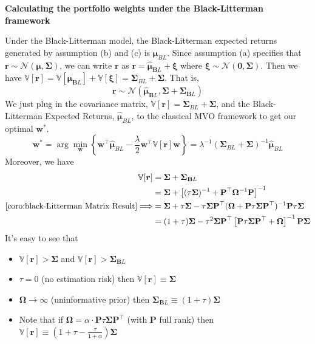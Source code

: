 \documentclass[13pt]{article}
\theoremstyle{definition}
\theoremstyle{remark}
\newenvironment{remark}
  {\pushQED{\qed}\renewcommand{\qedsymbol}{$\triangle$}\remarkx}
  {\popQED\endremarkx}
\begin{document}
{\color{C6}\textbf{Calculating the portfolio weights under the Black-Litterman framework}}

Under the Black-Litterman model, the Black-Litterman expected returns generated by assumption (b) and (c) is  $\bm{\mu}_{BL}$. Since assumption (a) specifies that $\bm{r} \sim \mathcal{N}\left(\bm{\mu}, \mathbf{\Sigma}\right)$, we can write $\bm{r}$ as $\bm{r} = \bm{\hat{\bm{\mu}}}_{\mathbf{B} L} + \bm{\xi}$ where $\bm{\xi} \sim \mathcal{N}\left(\bm{0}, \mathbf{\Sigma}\right)$. Then we have $\mathbb{V}[\bm{r}] = \mathbb{V}[\bm{\hat{\bm{\mu}}}_{\mathbf{B} L}] + \mathbb{V}[\bm{\xi}] = \mathbf{\Sigma}_{BL}+\mathbf{\Sigma}$. That is,
$$\bm{r} \sim \mathcal{N}\left(\bm{\hat{\bm{\mu}}}_{\mathbf{B} L}, \mathbf{\Sigma}+\mathbf{\Sigma}_{\mathbf{B} L}\right)$$
We just plug in the covariance matrix, $\mathbb{V}[\bm{r}] = \mathbf{\Sigma}_{BL}+\mathbf{\Sigma}$, and the Black-Litterman Expected Returns, $\bm{\hat{\bm{\mu}}}_{BL}$, to the classical MVO framework to get our optimal $\bm{w}^*$.
$$\bm{w}^*=\arg
\min_{\bm{w}}\left\{\bm{w}^\top \bm{\hat{\bm{\mu}}}_{BL}-\frac{\lambda}{2}\bm{w}^\top \mathbb{V}[\bm{r}]\bm{w} \right\}= \lambda^{-1}(\mathbf{\Sigma}_{BL}+\mathbf{\Sigma})^{-1}\bm{\hat{\bm{\mu}}}_{BL}
$$
\begin{remark}
Moreover, we have
$$
\begin{aligned}
\mathbb{V}[\bm{r}] & =\mathbf{\Sigma}+\mathbf{\Sigma}_{\mathbf{B} L} \\
& =\mathbf{\Sigma}+\left[(\tau \mathbf{\Sigma})^{-1}+\mathbf{P}^{\top} \mathbf{\Omega}^{-1} \mathbf{P}\right]^{-1} \\
\cref{coro:black-Litterman Matrix Result} \Longrightarrow& =\mathbf{\Sigma}+\tau \mathbf{\Sigma}-\tau \mathbf{\Sigma} \mathbf{P}^\top (\mathbf{\Omega}+\mathbf{P}\tau \mathbf{\Sigma} \mathbf{P}^\top)^{-1} \mathbf{P} \tau \mathbf{\Sigma}\\
&=(1+\tau) \mathbf{\Sigma}-\tau^{2} \mathbf{\Sigma} \mathbf{P}^{\top}\left[\mathbf{P} \tau \mathbf{\Sigma} \mathbf{P}^{\top}+\mathbf{\Omega}\right]^{-1} \mathbf{P} \mathbf{\Sigma}
\end{aligned}
$$
It's easy to see that 
\begin{itemize}
\item $\mathbb{V}[\bm{r}]>\mathbf{\Sigma}$ and $\mathbb{V}[\bm{r}]>\mathbf{\Sigma}_{\mathbf{B} L}$
    \item $\tau=0$ (no estimation risk) then $\mathbb{V}[\bm{r}] \equiv \mathbf{\Sigma}$
  \item $\mathbf{\Omega} \rightarrow \infty$ (uninformative prior) then $\mathbf{\Sigma}_{\mathbf{B} L} \equiv(1+\tau) \mathbf{\Sigma}$

  \item Note that if $\mathbf{\Omega}=\alpha \cdot \mathbf{P} \tau \mathbf{\Sigma} \mathbf{P}^{\top}$ (with $\mathrm{\mathbf{P}}$ full rank) then $\mathbb{V}[\bm{r}]\equiv\left(1+\tau-\frac{\tau}{1+\alpha}\right) \mathbf{\Sigma}$
\end{itemize}
\end{remark}
\end{document}
